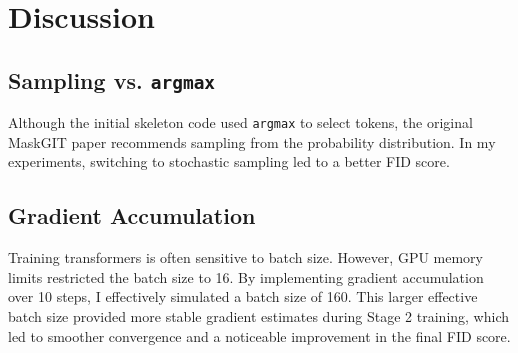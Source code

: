 \documentclass[10pt,twocolumn,letterpaper]{article}
\begin{document}
\section{Discussion}
\label{sec:discussion}

\subsection{Sampling vs. \textbf{\texttt{argmax}}}
Although the initial skeleton code used \texttt{argmax} to select tokens, the 
original MaskGIT paper recommends sampling from the probability distribution. 
In my experiments, switching to stochastic sampling led to a better 
FID score.

\subsection{Gradient Accumulation}
Training transformers is often sensitive to batch size. However, GPU memory limits
restricted the batch size to 16. By implementing gradient accumulation over 10
steps, I effectively simulated a batch size of 160. This larger effective batch
size provided more stable gradient estimates during Stage 2 training, which led
to smoother convergence and a noticeable improvement in the final FID score.

% 
% 
\end{document}
